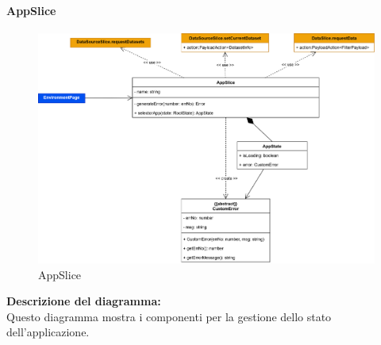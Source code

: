 \paragraph{AppSlice}
\begin{figure}[h!] \centering
      \includegraphics[scale=0.2]{template/images/uml_front/logic/AppSlice.png}
      \caption{AppSlice}
\end{figure}
\textbf{Descrizione del diagramma:}\\
Questo diagramma mostra i componenti per la gestione dello stato dell'applicazione.
